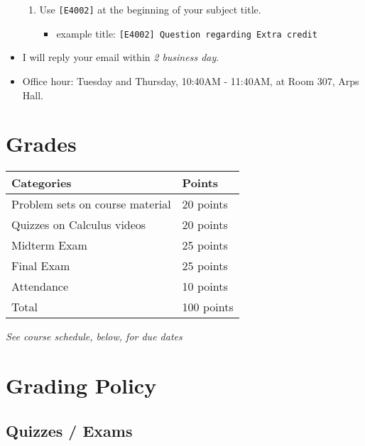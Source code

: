 \documentclass[12pt]{article}
\begin{document}
\begin{itemize}
\begin{enumerate}
        \item Use \texttt{[E4002]} at the beginning of your subject title.
        \begin{itemize}
            \item example title: \texttt{[E4002] Question regarding Extra credit}
        \end{itemize}
    \end{enumerate}
    \item I will reply your email within \textit{2 business day}.
    \item Office hour: Tuesday and Thursday, 10:40AM - 11:40AM, at Room 307, Arps Hall.
\end{itemize}

\newpage

\section*{Grades}

\newlength\q
\setlength{}
\begin{tabular}{|p{\q}|p{\q}|}
    \hline
    Categories  & Points \\
    \hline
    \hline
    Problem sets on course material   & 20 points \\
    \hline
    Quizzes on Calculus videos & 20 points \\
    \hline
    Midterm Exam & 25 points \\
    \hline
    Final Exam & 25 points \\
    \hline
    Attendance & 10 points \\
    \hline
    Total & 100 points \\
    \hline
\end{tabular}
\textit{See course schedule, below, for due dates}


\section*{Grading Policy}

\subsection*{Quizzes / Exams}
\end{document}

